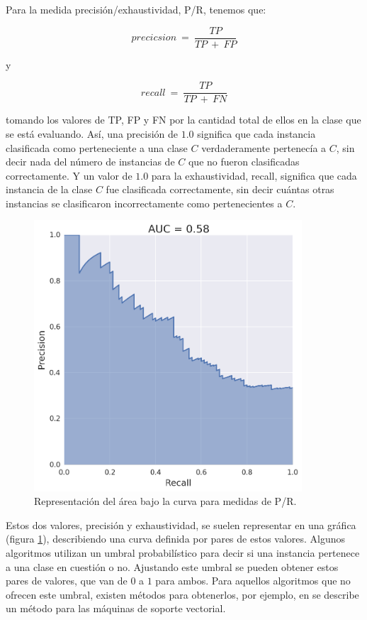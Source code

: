 Para la medida precisión/exhaustividad, P/R, tenemos que:

$$
precicsion\:=\:\frac{TP}{TP\:+\:FP}
$$

\noindent
y

$$
recall\:=\:\frac{TP}{TP\:+\:FN}
$$

\noindent
tomando los valores de TP, FP y FN por la cantidad total de ellos en la clase que se está evaluando. Así, una precisión de $1.0$ significa que cada instancia clasificada como perteneciente a una clase $C$ verdaderamente pertenecía a $C$, sin decir nada del número de instancias de $C$ que no fueron clasificadas correctamente. Y un valor de $1.0$ para la exhaustividad, recall, significa que cada instancia de la clase $C$ fue clasificada correctamente, sin decir cuántas otras instancias se clasificaron incorrectamente como pertenecientes a $C$.

\begin{figure}[ht]
  \centering
  \includegraphics[width=100mm]{figures/ch_03/pr_example.png}
  \caption{Representación del área bajo la curva para medidas de P/R.}
  \label{fig:3.9}
\end{figure}

Estos dos valores, precisión y exhaustividad, se suelen representar en una gráfica (figura \ref{fig:3.9}), describiendo una curva definida por pares de estos valores. Algunos algoritmos utilizan un umbral probabilístico para decir si una instancia pertenece a una clase en cuestión o no. Ajustando este umbral se pueden obtener estos pares de valores, que van de $0$ a $1$ para ambos. Para aquellos algoritmos que no ofrecen este umbral, existen métodos para obtenerlos, por ejemplo, en \cite{wu2004probability} se describe un método para las máquinas de soporte vectorial.

